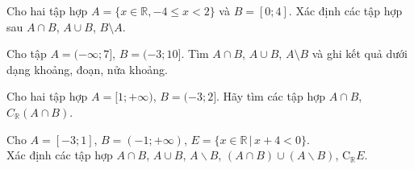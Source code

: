 \begin{bt}%
	  Cho hai tập hợp $A=\{x \in \mathbb{R},-4 \leq x<2\}$ và $B=[0 ; 4]$. Xác định các tập hợp sau  $A \cap B$, $A \cup B$, $B\setminus  A$.
	\loigiai{
		Ta có $ A=[-4;2) $, do đó 
		\begin{itemize}
			\item $A\cap B=[0;2).$
             \item $A\cup B=[-4;4].$
             \item $B \setminus A=[2;4].$ 
		\end{itemize}
	}
\end{bt}

\begin{bt}%
	Cho tập $A=(-\infty;7]$, $B=(-3;10]$. Tìm $A\cap B$, $A\cup B$, $A\setminus B$ và ghi kết quả dưới dạng khoảng, đoạn, nửa khoảng.	
	\loigiai{
		$\bullet\, A\cap B=(-3;7]$.\\
		$\bullet\, A\cup B=(-\infty;10]$.\\
		$\bullet\, A\setminus B=(-\infty;-3]$.
			
	}
\end{bt}

\begin{bt}%
	Cho hai tập hợp $A=[1;+\infty)$, $B=(-3;2]$. Hãy tìm các tập hợp $A\cap B$, $C_{\mathbb{R}}\left(A\cap B\right)$.
\end{bt}

\begin{bt}%
Cho $ A=[-3;1] $, $ B=(-1;+\infty) $, $ E=\{x\in\mathbb{R}\,|\,x+4<0\} $.\\
Xác định các tập hợp
$ A\cap B $, $ A\cup B $, $ A\backslash B $, $ (A\cap B)\cup  (A\backslash B) $, $ \mathrm{C}_{\mathbb{R}}E $.
\loigiai{
Cho $ A=[-3;1] $, $ B=(-1;+\infty) $, $ E=\{x\in\mathbb{R}\,|\,x+4<0\}=(-\infty;-4) $.\\
Ta có\\
$ A\cap B=(-1;1] $;\\
$ A\cup B=[-3;+\infty) $;\\
$ A\backslash B=[-3;-1] $;\\
$ (A\cap B)\cup  (A\backslash B) =(-1;1]\cup [-3;-1]=[-3;1] $;\\
$ \mathrm{C}_{\mathbb{R}}E=\mathbb{R}\backslash E=[-4;+\infty) $.
}
\end{bt}

